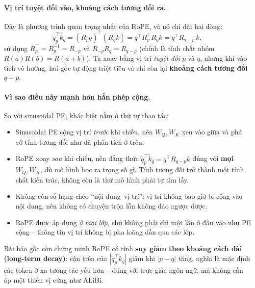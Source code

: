 \paragraph{Vị trí tuyệt đối vào, khoảng cách tương đối ra.} Đây là phương trình quan trọng nhất của RoPE, và nó chỉ dài hai dòng:
\[
\tilde{q}_p^\top \tilde{k}_q = (R_p q)^\top (R_q k) = q^\top R_p^\top R_q k = q^\top R_{q-p}\, k ,
\]
sử dụng $R_p^\top = R_p^{-1} = R_{-p}$ và $R_{-p} R_q = R_{q-p}$ (chính là tính chất nhóm $R(a)R(b) = R(a+b)$). Ta xoay bằng vị trí \emph{tuyệt đối} $p$ và $q$, nhưng khi vào tích vô hướng, hai góc tự động triệt tiêu và chỉ còn lại \textbf{khoảng cách tương đối} $q-p$.

\paragraph{Vì sao điều này mạnh hơn hẳn phép cộng.} So với sinusoidal PE, khác biệt nằm ở thứ tự thao tác:
\begin{itemize}
    \item Sinusoidal PE cộng vị trí \emph{trước} khi chiếu, nên $W_Q, W_K$ xen vào giữa và phá vỡ tính tương đối như đã phân tích ở trên.
    \item RoPE xoay \emph{sau} khi chiếu, nên đẳng thức $\tilde{q}_p^\top \tilde{k}_q = q^\top R_{q-p} k$ đúng với \textbf{mọi} $W_Q, W_K$, dù mô hình học ra trọng số gì. Tính tương đối trở thành một tính chất kiến trúc, không còn là thứ mô hình phải tự tìm lấy.
    \item Không còn số hạng chéo “nội dung--vị trí”: vị trí không bao giờ bị cộng vào nội dung, nên không có chuyện trộn lẫn không đảo ngược được.
    \item RoPE được áp dụng \emph{ở mọi lớp}, chứ không phải chỉ một lần ở đầu vào như PE cộng -- thông tin vị trí không bị pha loãng dần qua các lớp.
\end{itemize}
Bài báo gốc còn chứng minh RoPE có tính \textbf{suy giảm theo khoảng cách dài (long-term decay)}: cận trên của $|\tilde{q}_p^\top \tilde{k}_q|$ giảm khi $|p-q|$ tăng, nghĩa là mặc định các token ở xa tương tác yếu hơn -- đúng với trực giác ngôn ngữ, mà không cần áp một thiên vị cứng như ALiBi.

